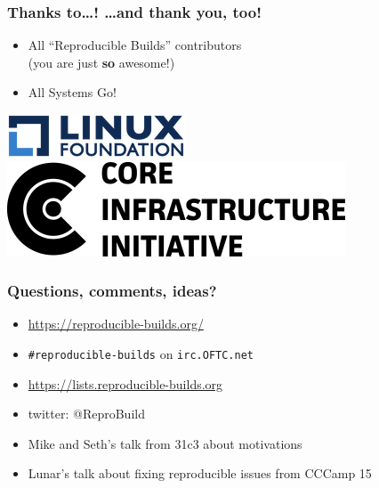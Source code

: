 \documentclass[14pt,aspectratio=169]{beamer}
\newif\ifplacelogo
\begin{document}
\begin{frame}
 \frametitle{Thanks to…! …and thank \textbf{you}, too!}

 \begin{itemize}
  \item
    {All “Reproducible Builds” contributors \\
        {\small (you are just \textbf{so} awesome!)}}
  \item All Systems Go!
\end{itemize}

 \begin{center}
  \includegraphics[height=0.1\paperheight]{images/linux_foundation_logo.png}
  \hspace{0.1\paperwidth}
  \includegraphics[height=0.1\paperheight]{images/cii_logo.png}
 \end{center}

 \vfill
 \begin{center}
 \end{center}
\end{frame}

\placelogofalse

\begin{frame}
 \frametitle{Questions, comments, ideas?}

 \begin{itemize}
  \item \url{https://reproducible-builds.org/}
  \item \texttt{\#reproducible-builds} on \texttt{irc.OFTC.net}
  \item \url{https://lists.reproducible-builds.org}
  \item twitter: @ReproBuild
  \item<2> Mike and Seth's talk from 31c3 about motivations
  \item<2> Lunar's talk about fixing reproducible issues from CCCamp 15
  \end{itemize}
\end{frame}
\end{document}

